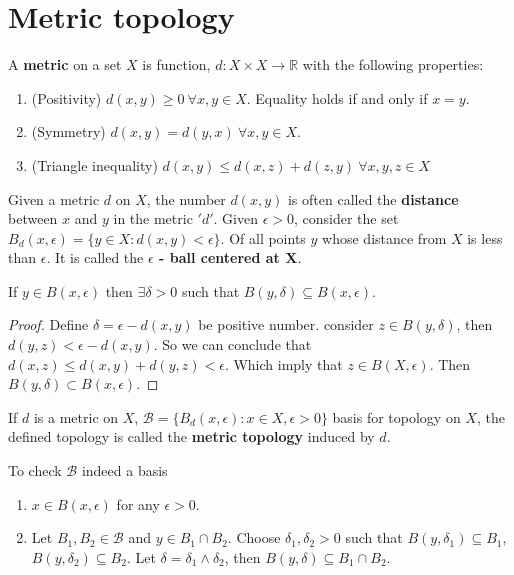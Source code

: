 \documentclass[a4paper,english,12pt]{article}   	%
\begin{document}
\section{Metric topology}
\begin{defn} 
A \textbf{metric} on a set $X$ is function, $d \colon X \times X \to \mathbb{R}$ with the following properties: 
\begin{enumerate}
\item(Positivity) $d(x,y) \geq 0 ~\forall x,y \in X$. Equality holds if and only if $x= y$.
\item(Symmetry) $d(x,y) = d(y,x) ~\forall x,y \in X$.
\item(Triangle inequality) $d(x,y) \leq d(x,z) + d(z,y) ~\forall x,y,z \in X$
\end{enumerate}
\end{defn}
\par Given a metric $d$ on $X$, the number $d(x,y)$ is often called the \textbf{distance} between $x$ and $y$ in the metric $'d'$. Given $\epsilon > 0$, consider the set $B_{d}(x,\epsilon) = \{y \in X \colon d(x,y) < \epsilon\}$. Of all points $y$ whose distance from $X$ is less than $\epsilon$. It is called the \textbf{$\epsilon$ - ball centered at X}.
\begin{lem}
If $y \in B(x,\epsilon)$ then $\exists \delta > 0$ such that $B(y,\delta) \subseteq B(x,\epsilon)$.
\end{lem}
\begin{proof}
Define $\delta = \epsilon - d(x,y)$ be positive number. consider $z \in B(y,\delta)$, then $d(y,z) < \epsilon - d(x,y)$. So we can conclude that $d(x,z) \leq d(x,y) + d(y,z) < \epsilon$. Which imply that $z \in B(X,\epsilon)$. Then $B(y,\delta) \subset B(x,\epsilon)$. 
\end{proof}
\begin{defn}
If $d$ is a metric on $X$, $\mathcal{B} = \{B_{d}(x,\epsilon) \colon x \in X , \epsilon > 0\}$ basis for topology on $X$, the defined topology is called the \textbf{metric topology} induced by $d$.
\end{defn}
To check $\mathcal{B}$ indeed a basis
\begin{enumerate}
\item $x \in B(x,\epsilon)$ for any $\epsilon > 0$.
\item Let $B_{1},B_{2} \in \mathcal{B}$ and $y \in B_{1} \cap B_{2}$. Choose $\delta_{1},\delta_{2} > 0$ such that $B(y,\delta_{1}) \subseteq B_{1}$, $B(y,\delta_{2}) \subseteq B_{2}$. Let $\delta = \delta_{1} \wedge \delta_{2}$, then $B(y,\delta) \subseteq B_{1} \cap B_{2}$. 
\end{enumerate}



\end{document}
